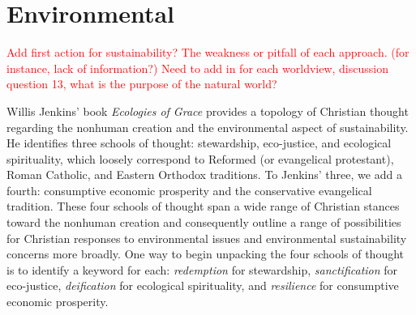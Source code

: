 \documentclass[12pt]{article}
\newcommand{\ins}[1]{\textcolor{red}{#1}}
\begin{document}



\section{Environmental}
\label{sec:environmental}

\ins{Add first action for sustainability? The weakness or pitfall of each approach. (for instance, lack of information?)
Need to add in for each worldview, discussion question 13, what is the purpose of the natural world?}

Willis Jenkins' book \emph{Ecologies of Grace} \autocite{Jenkins:2008}
provides a topology of Christian thought regarding the 
nonhuman creation and the
environmental aspect of sustainability.
He identifies three schools of thought:
stewardship, 
eco-justice, and 
ecological spirituality,
which loosely correspond to 
Reformed (or evangelical protestant), 
Roman Catholic, and 
Eastern Orthodox 
traditions.
To Jenkins' three, we add a fourth:
consumptive economic prosperity and
the conservative evangelical tradition. 
These four schools of thought 
span a wide range of Christian stances toward the nonhuman creation
and 
consequently outline a range of possibilities 
for Christian responses to environmental issues
and environmental sustainability concerns more broadly.
One way to begin unpacking the four schools of thought 
is to identify a keyword for each:
\emph{redemption} for stewardship, 
\emph{sanctification} for eco-justice,
\emph{deification} for ecological spirituality, and
\emph{resilience} for consumptive economic prosperity.
\end{document}
